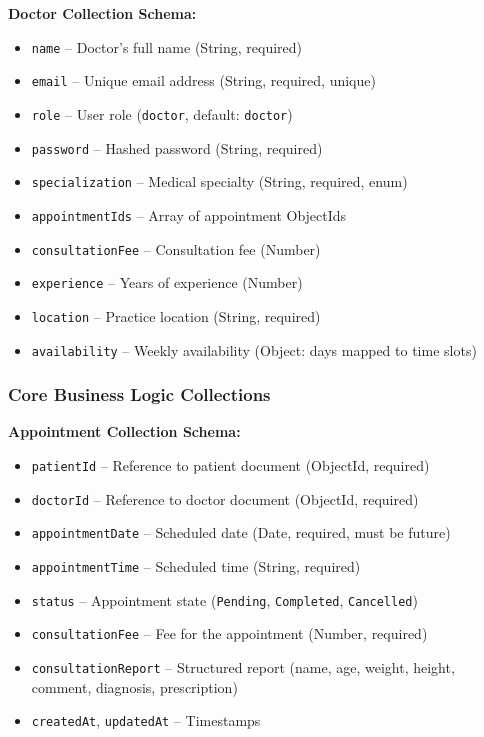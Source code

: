\documentclass[12pt]{article}
\begin{document}
\textbf{Doctor Collection Schema:}
\begin{itemize}[leftmargin=1cm]
    \item \texttt{name} -- Doctor's full name (String, required)
    \item \texttt{email} -- Unique email address (String, required, unique)
    \item \texttt{role} -- User role (\texttt{doctor}, default: \texttt{doctor})
    \item \texttt{password} -- Hashed password (String, required)
    \item \texttt{specialization} -- Medical specialty (String, required, enum)
    \item \texttt{appointmentIds} -- Array of appointment ObjectIds
    \item \texttt{consultationFee} -- Consultation fee (Number)
    \item \texttt{experience} -- Years of experience (Number)
    \item \texttt{location} -- Practice location (String, required)
    \item \texttt{availability} -- Weekly availability (Object: days mapped to time slots)
\end{itemize}

\subsubsection{Core Business Logic Collections}

\textbf{Appointment Collection Schema:}
\begin{itemize}[leftmargin=1cm]
    \item \texttt{patientId} -- Reference to patient document (ObjectId, required)
    \item \texttt{doctorId} -- Reference to doctor document (ObjectId, required)
    \item \texttt{appointmentDate} -- Scheduled date (Date, required, must be future)
    \item \texttt{appointmentTime} -- Scheduled time (String, required)
    \item \texttt{status} -- Appointment state (\texttt{Pending}, \texttt{Completed}, \texttt{Cancelled})
    \item \texttt{consultationFee} -- Fee for the appointment (Number, required)
    \item \texttt{consultationReport} -- Structured report (name, age, weight, height, comment, diagnosis, prescription)
    \item \texttt{createdAt}, \texttt{updatedAt} -- Timestamps
\end{itemize}
\end{document}
